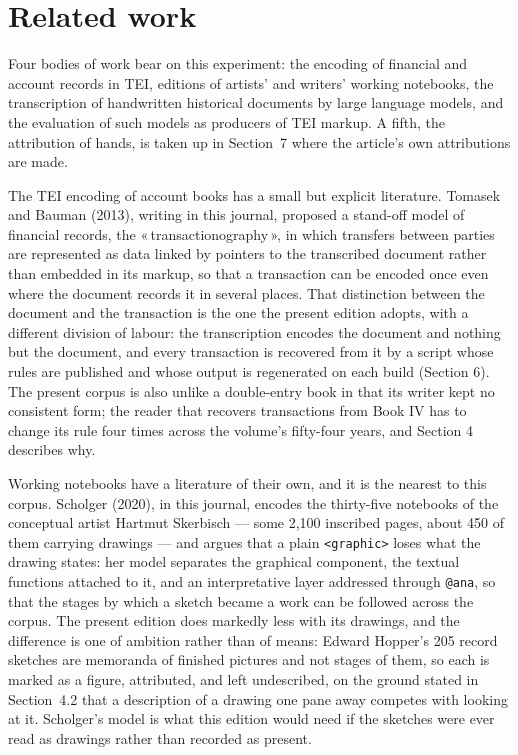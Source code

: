 \documentclass[11pt]{article}
\newcommand{\q}[1]{«\,#1\,»}
\begin{document}
\section{Related work}

Four bodies of work bear on this experiment: the encoding of financial and account records in TEI, editions of artists' and writers' working notebooks, the transcription of handwritten historical documents by large language models, and the evaluation of such models as producers of TEI markup. A fifth, the attribution of hands, is taken up in Section~7 where the article's own attributions are made.

The TEI encoding of account books has a small but explicit literature. Tomasek and Bauman (2013), writing in this journal, proposed a stand-off model of financial records, the \q{transactionography}, in which transfers between parties are represented as data linked by pointers to the transcribed document rather than embedded in its markup, so that a transaction can be encoded once even where the document records it in several places. That distinction between the document and the transaction is the one the present edition adopts, with a different division of labour: the transcription encodes the document and nothing but the document, and every transaction is recovered from it by a script whose rules are published and whose output is regenerated on each build (Section 6). The present corpus is also unlike a double-entry book in that its writer kept no consistent form; the reader that recovers transactions from Book IV has to change its rule four times across the volume's fifty-four years, and Section 4 describes why.

Working notebooks have a literature of their own, and it is the nearest to this
corpus. Scholger (2020), in this journal, encodes the thirty-five notebooks of
the conceptual artist Hartmut Skerbisch --- some 2,100 inscribed pages, about
450 of them carrying drawings --- and argues that a plain \texttt{<graphic>}
loses what the drawing states: her model separates the graphical component, the
textual functions attached to it, and an interpretative layer addressed through
\texttt{@ana}, so that the stages by which a sketch became a work can be
followed across the corpus. The present edition does markedly less with its
drawings, and the difference is one of ambition rather than of means: Edward
Hopper's 205 record sketches are memoranda of finished pictures and not stages
of them, so each is marked as a figure, attributed, and left undescribed, on the
ground stated in Section~4.2 that a description of a drawing one pane away
competes with looking at it. Scholger's model is what this edition would need if
the sketches were ever read as drawings rather than recorded as present.
\end{document}
